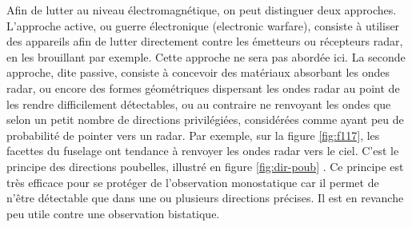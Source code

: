 \begin{table}[!htb]
    \caption{Présentation des différentes bandes radar couramment utilisées en aéronautique.}
    \label{tab:radar}
\end{table}


Afin de lutter au niveau électromagnétique, on peut distinguer deux approches. L'approche active, ou guerre électronique (electronic warfare), consiste à utiliser des appareils afin de lutter directement contre les émetteurs ou récepteurs radar, en les brouillant par exemple. Cette approche ne sera pas abordée ici. La seconde approche, dite passive, consiste à concevoir des matériaux absorbant les ondes radar, ou encore des formes géométriques dispersant les ondes radar au point de les rendre difficilement détectables, ou au contraire ne renvoyant les ondes que selon un petit nombre de directions privilégiées, considérées comme ayant peu de probabilité de pointer vers un radar. Par exemple, sur la figure \ref{fig:f117}, les facettes du fuselage ont tendance à renvoyer les ondes radar vers le ciel. C'est le principe des directions poubelles, illustré en figure \ref{fig:dir-poub} \citep{Zikidis2014}. Ce principe est très efficace pour se protéger de l'observation monostatique car il permet de n'être détectable que dans une ou plusieurs directions précises. Il est en revanche peu utile contre une observation bistatique.

